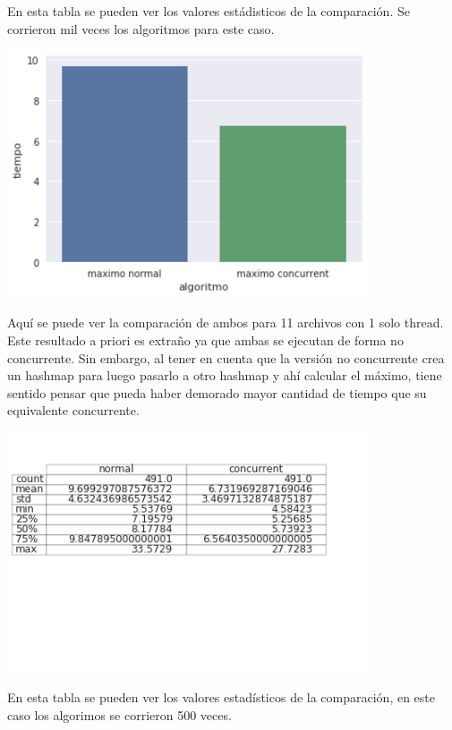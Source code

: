 En esta tabla se pueden ver los valores estádisticos de la comparación. Se
corrieron mil veces los algoritmos para este caso.

\begin{center}
\includegraphics[width=0.8\textwidth]{imagenes/maxvsmax1thread.png}
\end{center}

Aquí se puede ver la comparación de ambos para 11 archivos con 1 solo thread.\\
Este resultado a priori es extraño ya que ambas se ejecutan de forma no concurrente. Sin embargo, al tener en cuenta que la versión no concurrente crea un hashmap para luego pasarlo a otro hashmap y ahí calcular el máximo, tiene sentido pensar que pueda haber demorado mayor cantidad de tiempo que su equivalente concurrente.

\begin{center}
\includegraphics[width=0.8\textwidth]{imagenes/descplot2.png}
\end{center}

En esta tabla se pueden ver los valores estadísticos de la comparación, en este caso
los algorimos se corrieron 500 veces.


